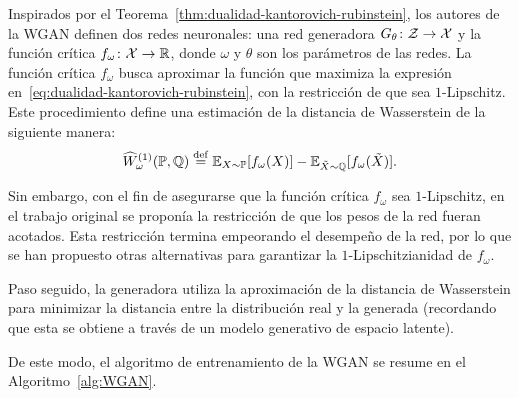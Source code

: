 {{        Inspirados por el Teorema~\ref{thm:dualidad-kantorovich-rubinstein}, los autores de la WGAN definen dos redes neuronales: una red generadora $G_\theta\colon\mathcal{Z}\to\mathcal{X}$ y la función crítica $f_\omega \colon \mathcal{X} \to \mathbb{R}$, donde $\omega$ y $\theta$ son los parámetros de las redes. La función crítica $f_\omega$ busca aproximar la función que maximiza la expresión en~\eqref{eq:dualidad-kantorovich-rubinstein}, con la restricción de que sea $1$-Lipschitz. Este procedimiento define una estimación de la distancia de Wasserstein de la siguiente manera:
        \begin{equation}\label{eq:wasserstein-estimation}
            \widehat W_\omega^{(1)} (\Prob, \ProbQ) \eqdef \Exp_{X\sim \Prob} [f_\omega(X)] - \Exp_{\tilde X \sim \ProbQ} [f_\omega(\tilde X)].
        \end{equation}

        Sin embargo, con el fin de asegurarse que la función crítica $f_\omega$ sea $1$-Lipschitz, en el trabajo original se proponía la restricción de que los pesos de la red fueran acotados. Esta restricción termina empeorando el desempeño de la red, por lo que se han propuesto otras alternativas para garantizar la $1$-Lipschitzianidad de $f_\omega$.

        Paso seguido, la generadora utiliza la aproximación de la distancia de Wasserstein para minimizar la distancia entre la distribución real y la generada (recordando que esta se obtiene a través de un modelo generativo de espacio latente).

        De este modo, el algoritmo de entrenamiento de la WGAN se resume en el Algoritmo~\ref{alg:WGAN}.

}}
